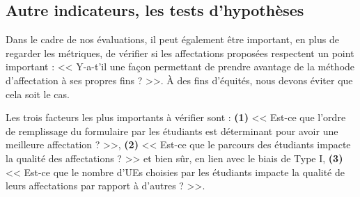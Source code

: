 \documentclass{rapport}
\theoremstyle{definition}
\theoremstyle{remark}
\theoremstyle{definition}
\theoremstyle{remark}
\begin{document}
\subsection{Autre indicateurs, les tests d'hypothèses}
Dans le cadre de nos évaluations, il peut également être important, en plus de regarder les métriques, de vérifier si les affectations proposées respectent un point important : << Y-a-t'il une façon permettant de prendre avantage de la méthode d'affectation à ses propres fins ? >>.
À des fins d'équités, nous devons éviter que cela soit le cas.

Les trois facteurs les plus importants à vérifier sont : \textbf{(1)} << Est-ce que l'ordre de remplissage du formulaire par les étudiants est déterminant pour avoir une meilleure affectation ? >>,
\textbf{(2)} << Est-ce que le parcours des étudiants impacte la qualité des affectations ? >> et bien sûr, en lien avec le biais de Type I, \textbf{(3)} << Est-ce que le nombre d'UEs choisies par les étudiants impacte la qualité de leurs affectations par rapport à d'autres ? >>.
\end{document}
